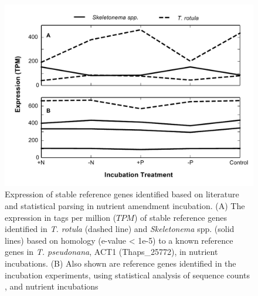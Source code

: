 \begin{figure}[p!]
  \centering
    \includegraphics[width=1\textwidth]{Images/C3_SFigure4_StableGenePlot_wActin.pdf}
    \caption[Expression of stable reference genes in the field]{Expression of stable reference genes identified based on literature and statistical parsing in nutrient amendment incubation. (A) The expression in tags per million ($TPM$) of stable reference genes identified in \textit{T. rotula} (dashed line) and \textit{Skeletonema} spp.  (solid lines) based on homology (e-value < 1e-5) to a known reference genes in \textit{T. pseudonana}, ACT1 (Thaps\_25772), in nutrient incubations. (B) Also shown are reference genes identified in the incubation experiments, using statistical analysis of sequence counts \citep{Alexander2012, Wu2010}, and nutrient incubations }
  \label{fig:a3f4}
\end{figure}

